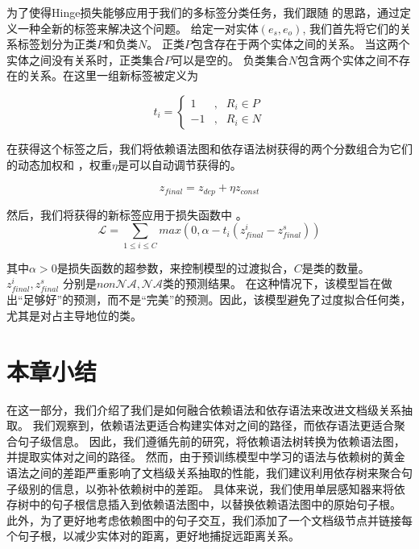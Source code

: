 \documentclass[bachelor]{thesis-uestc}
\begin{document}
为了使得Hinge损失能够应用于我们的多标签分类任务，我们跟随 \cite{SagDRE} 的思路，通过定义一种全新的标签来解决这个问题。
给定一对实体$(e_s, e_o)$, 我们首先将它们的关系标签划分为正类$P$和负类$N$。
正类$P$包含存在于两个实体之间的关系。
当这两个实体之间没有关系时，正类集合$P$可以是空的。
负类集合$N$包含两个实体之间不存在的关系。在这里一组新标签被定义为

\begin{equation}
    t_i = \left\{
	\begin{aligned}
		1 & , & R_i \in P \\
        -1 & , & R_i \in N
    \end{aligned}
	\right.
\end{equation}\par
在获得这个标签之后，我们将依赖语法图和依存语法树获得的两个分数组合为它们的动态加权和 \cite{kendall2018multi}，权重$\eta$是可以自动调节获得的。

\begin{equation}
    \label{eta}
    z_{final} = z_{dep} + \eta z_{const}
\end{equation}
\par 
然后，我们将获得的新标签应用于损失函数中 \cite{SagDRE}。
\begin{equation}
    \label{loss}
    \mathcal{L} = \sum_{1 \le i \le C} max(0, \alpha-t_i(z^i_{final} - z^s_{final}))
\end{equation}

其中$\alpha>0$是损失函数的超参数，来控制模型的过渡拟合，$C$是类的数量。$z^i_{final}, z^s_{final}$ 分别是$non\mathcal{NA}, \mathcal{NA}$类的预测结果。
在这种情况下，该模型旨在做出“足够好”的预测，而不是“完美”的预测。因此，该模型避免了过度拟合任何类，尤其是对占主导地位的类。\par

\section{本章小结}
在这一部分，我们介绍了我们是如何融合依赖语法和依存语法来改进文档级关系抽取。
我们观察到，依赖语法更适合构建实体对之间的路径，而依存语法更适合聚合句子级信息。
因此，我们遵循先前的研究，将依赖语法树转换为依赖语法图，并提取实体对之间的路径。
然而，由于预训练模型中学习的语法与依赖树的黄金语法之间的差距严重影响了文档级关系抽取的性能，我们建议利用依存树来聚合句子级别的信息，以弥补依赖树中的差距。
具体来说，我们使用单层感知器来将依存树中的句子根信息插入到依赖语法图中，以替换依赖语法图中的原始句子根。
此外，为了更好地考虑依赖图中的句子交互，我们添加了一个文档级节点并链接每个句子根，以减少实体对的距离，更好地捕捉远距离关系。
\end{document}
